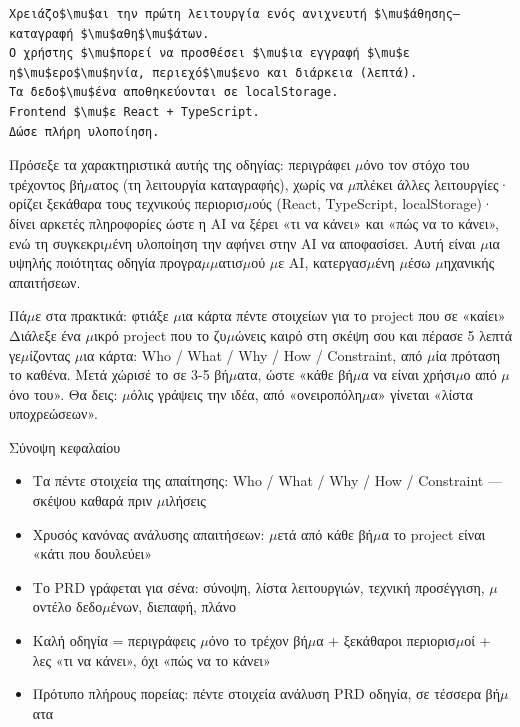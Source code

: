 \begin{lstlisting}
Χρειάζο$\mu$αι την πρώτη λειτουργία ενός ανιχνευτή $\mu$άθησης—καταγραφή $\mu$αθη$\mu$άτων.
Ο χρήστης $\mu$πορεί να προσθέσει $\mu$ια εγγραφή $\mu$ε η$\mu$ερο$\mu$ηνία, περιεχό$\mu$ενο και διάρκεια (λεπτά).
Τα δεδο$\mu$ένα αποθηκεύονται σε localStorage.
Frontend $\mu$ε React + TypeScript.
Δώσε πλήρη υλοποίηση.
\end{lstlisting}

Πρόσεξε τα χαρακτηριστικά αυτής της οδηγίας: περιγράφει $\mu$όνο τον στόχο του τρέχοντος βή$\mu$ατος (τη λειτουργία καταγραφής), χωρίς να $\mu$πλέκει άλλες λειτουργίες· ορίζει ξεκάθαρα τους τεχνικούς περιορισ$\mu$ούς (React, TypeScript, localStorage)· δίνει αρκετές πληροφορίες ώστε η AI να ξέρει «τι να κάνει» και «πώς να το κάνει», ενώ τη συγκεκρι$\mu$ένη υλοποίηση την αφήνει στην AI να αποφασίσει. Αυτή είναι $\mu$ια υψηλής ποιότητας οδηγία προγρα$\mu$$\mu$ατισ$\mu$ού $\mu$ε AI, κατεργασ$\mu$ένη $\mu$έσω $\mu$ηχανικής απαιτήσεων.

\begin{tcbpractice}{Πά$\mu$ε στα πρακτικά: φτιάξε $\mu$ια κάρτα πέντε στοιχείων για το project που σε «καίει»}
Διάλεξε ένα $\mu$ικρό project που το ζυ$\mu$ώνεις καιρό στη σκέψη σου και πέρασε 5 λεπτά γε$\mu$ίζοντας $\mu$ια κάρτα: Who / What / Why / How / Constraint, από $\mu$ία πρόταση το καθένα. Μετά χώρισέ το σε 3-5 βή$\mu$ατα, ώστε «κάθε βή$\mu$α να είναι χρήσι$\mu$ο από $\mu$όνο του». Θα δεις: $\mu$όλις γράψεις την ιδέα, από «ονειροπόλη$\mu$α» γίνεται «λίστα υποχρεώσεων».

\end{tcbpractice}

\begin{tcbsummary}{Σύνοψη κεφαλαίου}
\begin{itemize}
  \item Τα πέντε στοιχεία της απαίτησης: Who / What / Why / How / Constraint — σκέψου καθαρά πριν $\mu$ιλήσεις
  \item Χρυσός κανόνας ανάλυσης απαιτήσεων: $\mu$ετά από κάθε βή$\mu$α το project είναι «κάτι που δουλεύει»
  \item Το PRD γράφεται για σένα: σύνοψη, λίστα λειτουργιών, τεχνική προσέγγιση, $\mu$οντέλο δεδο$\mu$ένων, διεπαφή, πλάνο
  \item Καλή οδηγία = περιγράφεις $\mu$όνο το τρέχον βή$\mu$α + ξεκάθαροι περιορισ$\mu$οί + λες «τι να κάνει», όχι «πώς να το κάνει»
  \item Πρότυπο πλήρους πορείας: πέντε στοιχεία ανάλυση PRD οδηγία, σε τέσσερα βή$\mu$ατα
\end{itemize}

\end{tcbsummary}
